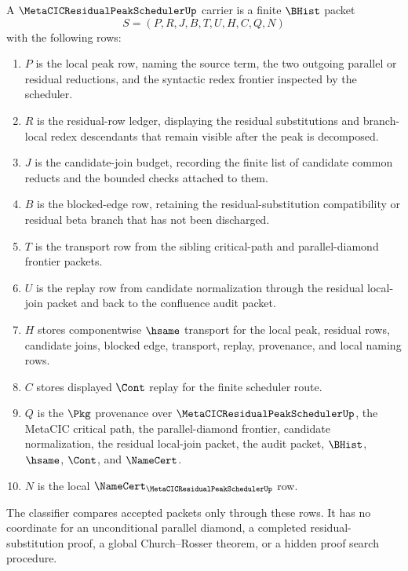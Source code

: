 \begin{definition}
\label{def:metacic-residual-peak-scheduler-carrier}
A $\MetaCICResidualPeakSchedulerUp$ carrier is a finite $\BHist$ packet
$$
S=(P,R,J,B,T,U,H,C,Q,N)
$$
with the following rows:
\begin{enumerate}
\item $P$ is the local peak row, naming the source term, the two outgoing parallel or residual reductions, and the syntactic redex frontier inspected by the scheduler.
\item $R$ is the residual-row ledger, displaying the residual substitutions and branch-local redex descendants that remain visible after the peak is decomposed.
\item $J$ is the candidate-join budget, recording the finite list of candidate common reducts and the bounded checks attached to them.
\item $B$ is the blocked-edge row, retaining the residual-substitution compatibility or residual beta branch that has not been discharged.
\item $T$ is the transport row from the sibling critical-path and parallel-diamond frontier packets.
\item $U$ is the replay row from candidate normalization through the residual local-join packet and back to the confluence audit packet.
\item $H$ stores componentwise $\hsame$ transport for the local peak, residual rows, candidate joins, blocked edge, transport, replay, provenance, and local naming rows.
\item $C$ stores displayed $\Cont$ replay for the finite scheduler route.
\item $Q$ is the $\Pkg$ provenance over $\MetaCICResidualPeakSchedulerUp$, the MetaCIC critical path, the parallel-diamond frontier, candidate normalization, the residual local-join packet, the audit packet, $\BHist$, $\hsame$, $\Cont$, and $\NameCert$.
\item $N$ is the local $\NameCert_{\MetaCICResidualPeakSchedulerUp}$ row.
\end{enumerate}
The classifier compares accepted packets only through these rows. It has no coordinate for an unconditional parallel diamond, a completed residual-substitution proof, a global Church--Rosser theorem, or a hidden proof search procedure.
\end{definition}

